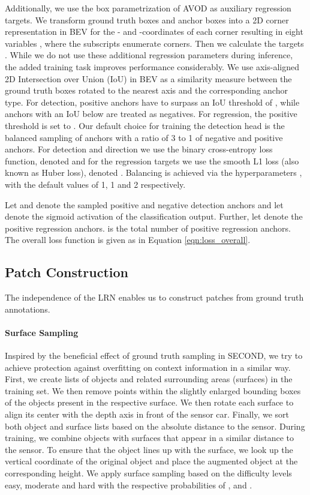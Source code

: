 \documentclass{article}
\begin{document}
Additionally, we use the box parametrization of AVOD \cite{Ku2018avod} as auxiliary regression targets. We transform ground truth boxes and anchor boxes into a 2D corner representation in BEV  for the - and -coordinates of each corner resulting in eight variables , where the subscripts enumerate corners. Then we calculate the targets .
While we do not use these additional regression parameters during inference, the added training task improves performance considerably.
We use axis-aligned 2D Intersection over Union (IoU) in BEV as a similarity measure between the ground truth boxes rotated to the nearest axis and the corresponding anchor type. 
For detection, positive anchors have to surpass an IoU threshold of , while anchors with an IoU below  are treated as negatives. 
For regression, the positive threshold is set to . 
Our default choice for training the detection head is the balanced sampling of  anchors with a ratio of 3 to 1 of negative and positive anchors. 
For detection and direction we use the binary cross-entropy loss function, denoted  and for the regression targets we use the smooth L1 loss (also known as Huber loss), denoted . Balancing is achieved via the hyperparameters , with the default values of 1, 1 and 2 respectively.

Let  and  denote the sampled positive and negative detection anchors and let  denote the sigmoid activation of the classification output. Further, let  denote the positive regression anchors.  is the total number of positive regression anchors. The overall loss function is given as in Equation \eqref{eqn:loss_overall}.



\subsection{Patch Construction}\label{sec:augmentation}
The independence of the LRN enables us to construct patches from ground truth annotations.

\paragraph{Surface Sampling}
Inspired by the beneficial effect of ground truth sampling in SECOND, we try to achieve protection against overfitting on context information in a similar way. First, we create lists of objects and related surrounding areas (surfaces) in the training set. We then remove points within the slightly enlarged bounding boxes of the objects present in the respective surface. We then rotate each surface to align its center with the depth axis in front of the sensor car. Finally, we sort both object and surface lists based on the absolute distance to the sensor. 
During training, we combine objects with surfaces that appear in a similar distance to the sensor. To ensure that the object lines up with the surface, we look up the vertical coordinate of the original object and place the augmented object at the corresponding height. We apply surface sampling based on the difficulty levels easy, moderate and hard with the respective probabilities of ,  and .
\end{document}

